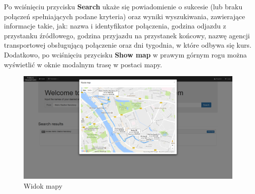\documentclass[10pt,a4paper]{article}
\begin{document}
Po wciśnięciu przycisku \textbf{Search} ukaże się powiadomienie o sukcesie (lub braku połączeń spełniających podane kryteria) oraz wyniki wyszukiwania, zawierające informacje takie, jak: nazwa i identyfikator połączenia, godzina odjazdu z przystanku źródłowego, godzina przyjazdu na przystanek końcowy, nazwę agencji transportowej obsługującą połączenie oraz dni tygodnia, w które odbywa się kurs. Dodatkowo, po wciśnięciu przycisku \textbf{Show map} w prawym górnym rogu można wyświetlić w oknie modalnym trasę w postaci mapy.
\begin{figure}[H]
	\centering
	\includegraphics[width=15cm]{Resources/Images/27_map.png}
	\caption{Widok mapy}
\end{figure}
\end{document}
